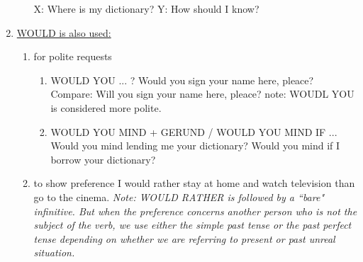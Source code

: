 \begin{enumerate}
\begin{enumerate}
                \newline
                X: Where is my dictionary?
                \newline
                Y: How should I know?
        \end{enumerate}
    \item \underline{WOULD is also used:}
        \begin{enumerate}
            \item for polite requests
                \begin{enumerate}
                    \item WOULD YOU ... ?
                        \newline
                        \newline
                        Would you sign your name here, pleace?
                        \newline
                        Compare: Will you sign your name here, pleace?
                        \newline
                        note: WOUDL YOU is considered more polite.
                    \item WOULD YOU MIND + GERUND / WOULD  YOU MIND IF ...
                        \newline
                        \newline
                        Would you mind lending me your dictionary?
                        \newline
                        Would you mind if I borrow your dictionary?
                \end{enumerate}
            \item to show preference
                \newline
                \newline
                I would rather stay at home and watch television than go to the
                cinema.
                \newline
                \newline
                {\it Note: WOULD RATHER is followed by a ``bare" infinitive. But
                when the preference concerns another person who is not the
                subject of the verb, we use either the simple past tense or the
                past perfect tense depending on whether we are referring to
                present or past unreal situation.}
                \newline
                \newline

\end{enumerate}
\end{enumerate}
